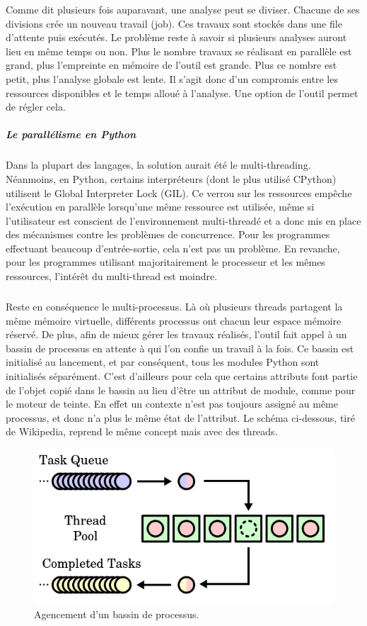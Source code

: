 Comme dit plusieurs fois auparavant, une analyse peut se diviser. Chacune de ses divisions crée un nouveau travail (job). Ces travaux sont stockés dans une file d'attente
puis exécutés. Le problème reste à savoir si plusieurs analyses auront lieu en même temps ou non. Plus le nombre travaux se réalisant en parallèle est grand, plus l'empreinte en mémoire de l'outil
est grande. Plus ce nombre est petit, plus l'analyse globale est lente. Il s'agit donc d'un compromis entre les ressources disponibles et le temps alloué à l'analyse. Une option de l'outil permet
de régler cela.
\subparagraph{Le parallélisme en Python}
Dans la plupart des langages, la solution aurait été le multi-threading. Néanmoins, en Python, certains interpréteurs (dont le plus utilisé CPython) utilisent le Global Interpreter Lock (GIL).
Ce verrou sur les ressources empêche l'exécution en parallèle lorsqu'une même ressource est utilisée, même si l'utilisateur est conscient de l'environnement multi-threadé et a donc mis en place
des mécanismes contre les problèmes de concurrence. Pour les programmes effectuant beaucoup d'entrée-sortie, cela n'est pas un problème. En revanche, pour les programmes utilisant majoritairement
le processeur et les mêmes ressources, l'intérêt du multi-thread est moindre.
\subparagraph{}
Reste en conséquence le multi-processus. Là où plusieurs threads partagent la même mémoire virtuelle, différents processus ont chacun leur espace mémoire réservé. De plus,
afin de mieux gérer les travaux réalisés, l'outil fait appel à un bassin de processus en attente à qui l'on confie un travail à la fois. Ce bassin est initialisé au lancement,
et par conséquent, tous les modules Python sont initialisés séparément. C'est d'ailleurs pour cela que certains attributs font partie de l'objet copié dans le bassin au lieu d'être
un attribut de module, comme pour le moteur de teinte. En effet un contexte n'est pas toujours assigné au même processus, et donc n'a plus le même état de l'attribut.
Le schéma ci-dessous, tiré de Wikipedia, reprend le même concept mais avec des threads.
\begin{figure}[h]
    \centering
    \includegraphics[scale=0.5]{images/threadpool.png}\newline
    \caption{Agencement d'un bassin de processus.}
\end{figure}

